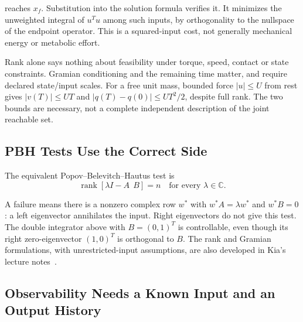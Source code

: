 reaches $x_f$. Substitution into the solution formula verifies it. It minimizes the unweighted integral of $u^Tu$ among such inputs, by orthogonality to the nullspace of the endpoint operator. This is a squared-input cost, not generally mechanical energy or metabolic effort.

Rank alone says nothing about feasibility under torque, speed, contact or state constraints. Gramian conditioning and the remaining time matter, and require declared state/input scales. For a free unit mass, bounded force $|u|\leq U$ from rest gives $|v(T)|\leq UT$ and $|q(T)-q(0)|\leq UT^2/2$, despite full rank. The two bounds are necessary, not a complete independent description of the joint reachable set.

\subsection{PBH Tests Use the Correct Side}

The equivalent Popov--Belevitch--Hautus test is
\begin{equation}
\label{eq:state_pbh}
 \operatorname{rank}[\lambda I-A\ \ B]=n\quad\text{for every }\lambda\in\mathbb C.
\end{equation}

A failure means there is a nonzero complex row $w^*$ with $w^*A=\lambda w^*$ and $w^*B=0$: a left eigenvector annihilates the input. Right eigenvectors do not give this test. The double integrator above with $B=(0,1)^T$ is controllable, even though its right zero-eigenvector $(1,0)^T$ is orthogonal to $B$. The rank and Gramian formulations, with unrestricted-input assumptions, are also developed in Kia's lecture notes~\cite{KiaReachabilityNotes}.

\subsection{Observability Needs a Known Input and an Output History}
\label{sec:observability}


